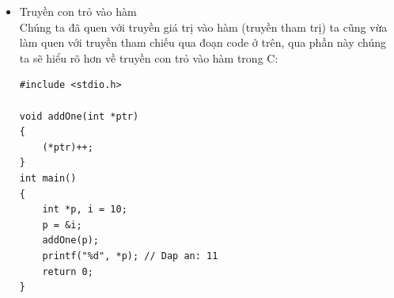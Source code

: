 \documentclass[12pt,a4paper]{article}
\begin{document}
\begin{itemize}
\begin{itemize}
\begin{lstlisting}
	void swap(int a, int b){
    		printf("Ham con, truoc khi goi ham hoan vi, a = %d, b = %d\n", a , b);
    		int tmp = a;
    		a = b;
    		b = tmp;
    		printf("Ham con, sau khi goi ham hoan vi, a = %d, b = %d\n", a , b);
	}
 
	int main(){
    		int a = 5, b = 7;
    		printf("Ham main, truoc khi goi ham hoan vi, a = %d, b = %d\n", a , b);
    		swap(a, b);
    		printf("Ham main, sau khi goi ham hoan vi, a = %d, b = %d\n", a , b);
}
 ----------
 KQ:
	Ham main, truoc khi goi ham hoan vi, a = 5, b = 7
	Ham con, truoc khi goi ham hoan vi, a = 5, b = 7
	Ham con, sau khi goi ham hoan vi, a = 7, b = 5
	Ham main, sau khi goi ham hoan vi, a = 5, b = 7
\end{lstlisting}
Tương tự như bài toán này nhưng ta thử truyền tham chiếu bằng cách tham chiếu Và chứng minh cho việc khi ta có địa chỉ biến thì ta có thể thay đổi giá trị biến mà con trỏ đang truyền tới:
\begin{lstlisting}
#include <stdio.h>
 
void swap(int *a, int *b){
    printf("Ham con, truoc khi goi ham hoan vi, a = %d, b = %d\n", *a , *b);
    int tmp = *a; 
    *a = *b; 
    *b = tmp;
    printf("Ham con, sau khi goi ham hoan vi, a = %d, b = %d\n", *a , *b);
}
 
int main(){
    int a = 5, b = 7;
    printf("Ham main, truoc khi goi ham hoan vi, a = %d, b = %d\n", a , b);
    swap(&a, &b);
    printf("Ham main, sau khi goi ham hoan vi, a = %d, b = %d\n", a , b);
}
--------
KQ:
Ham main, truoc khi goi ham hoan vi, a = 5, b = 7
Ham con, truoc khi goi ham hoan vi, a = 5, b = 7
Ham con, sau khi goi ham hoan vi, a = 7, b = 5
Ham main, sau khi goi ham hoan vi, a = 7, b = 5 
\end{lstlisting}

\item {\large Truyền con trỏ vào hàm}\\
Chúng ta đã quen với truyền giá trị vào hàm (truyền tham trị) ta cũng vừa làm quen với truyền tham chiếu qua đoạn code ở trên, qua phần này chúng ta sẽ hiểu rõ hơn về truyền con trỏ vào hàm trong C:
\begin{lstlisting}
#include <stdio.h>
 
void addOne(int *ptr)
{
    (*ptr)++;
}
int main()
{
    int *p, i = 10;
    p = &i;
    addOne(p);
    printf("%d", *p); // Dap an: 11
    return 0;
}
\end{lstlisting} 
\end{itemize}

\begin{center}

\end{center}
\end{itemize}
\end{document}

